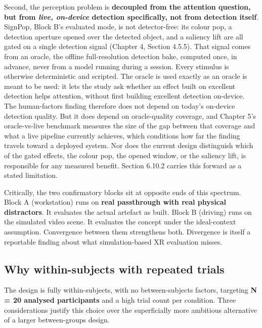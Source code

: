Second, the perception problem is \textbf{decoupled from the attention question, but from
\textit{live, on-device} detection specifically, not from detection itself}. SignPop, Block B's
evaluated mode, is not detector-free: its colour pop, a detection aperture opened over the detected
object, and a saliency lift are all gated on a single detection signal (Chapter 4, Section 4.5.5).
That signal comes from an oracle, the offline full-resolution detection bake, computed once, in
advance, never from a model running during a session. Every stimulus is otherwise deterministic and
scripted. The oracle is used exactly as an oracle is meant to be used: it lets the study ask whether
an effect built on excellent detection helps attention, without first building excellent detection
on-device. The human-factors finding therefore does not depend on today's on-device detection
quality. But it does depend on oracle-quality coverage, and Chapter 5's oracle-vs-live benchmark
measures the size of the gap between that coverage and what a live pipeline currently achieves,
which conditions how far the finding travels toward a deployed system. Nor does the current design
distinguish which of the gated effects, the colour pop, the opened window, or the saliency lift,
is responsible for any measured benefit. Section 6.10.2 carries this forward as a stated limitation.

Critically, the two confirmatory blocks sit at opposite ends of this spectrum. Block A (workstation)
runs on \textbf{real passthrough with real physical distractors}. It evaluates the actual artefact as
built. Block B (driving) runs on the simulated video scene. It evaluates the concept under the
ideal-context assumption. Convergence between them strengthens both. Divergence is itself a
reportable finding about what simulation-based XR evaluation misses.

\subsection{Why within-subjects with repeated trials}

The design is fully within-subjects, with no between-subjects factors, targeting \textbf{N = 20 analysed
participants} and a high trial count per condition. Three considerations justify this choice over the
superficially more ambitious alternative of a larger between-groups design.

